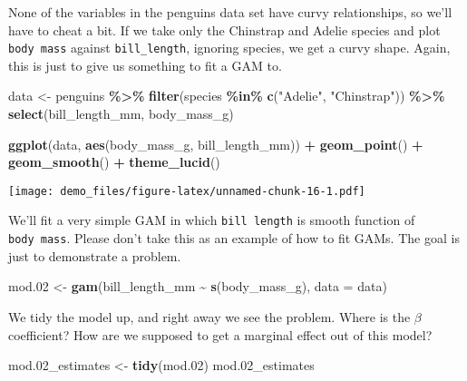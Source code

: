 \documentclass[
]{article}
\newenvironment{Shaded}{\begin{snugshade}}{\end{snugshade}}
\newcommand{\AttributeTok}[1]{\textcolor[rgb]{0.13,0.29,0.53}{#1}}
\newcommand{\FloatTok}[1]{\textcolor[rgb]{0.00,0.00,0.81}{#1}}
\newcommand{\FunctionTok}[1]{\textcolor[rgb]{0.13,0.29,0.53}{\textbf{#1}}}
\newcommand{\NormalTok}[1]{#1}
\newcommand{\OtherTok}[1]{\textcolor[rgb]{0.56,0.35,0.01}{#1}}
\newcommand{\SpecialCharTok}[1]{\textcolor[rgb]{0.81,0.36,0.00}{\textbf{#1}}}
\newcommand{\StringTok}[1]{\textcolor[rgb]{0.31,0.60,0.02}{#1}}
\begin{document}
None of the variables in the penguins data set have curvy relationships,
so we'll have to cheat a bit. If we take only the Chinstrap and Adelie
species and plot \texttt{body\ mass} against \texttt{bill\_length},
ignoring species, we get a curvy shape. Again, this is just to give us
something to fit a GAM to.

\begin{Shaded}
\begin{Highlighting}[]
\NormalTok{data }\OtherTok{\textless{}{-}}\NormalTok{ penguins }\SpecialCharTok{\%\textgreater{}\%}
  \FunctionTok{filter}\NormalTok{(species }\SpecialCharTok{\%in\%} \FunctionTok{c}\NormalTok{(}\StringTok{"Adelie"}\NormalTok{, }\StringTok{"Chinstrap"}\NormalTok{)) }\SpecialCharTok{\%\textgreater{}\%}
  \FunctionTok{select}\NormalTok{(bill\_length\_mm, body\_mass\_g)}

\FunctionTok{ggplot}\NormalTok{(data, }\FunctionTok{aes}\NormalTok{(body\_mass\_g, bill\_length\_mm)) }\SpecialCharTok{+}
  \FunctionTok{geom\_point}\NormalTok{() }\SpecialCharTok{+}
  \FunctionTok{geom\_smooth}\NormalTok{() }\SpecialCharTok{+}
  \FunctionTok{theme\_lucid}\NormalTok{()}
\end{Highlighting}
\end{Shaded}

\texttt{[image: demo\_files/figure-latex/unnamed-chunk-16-1.pdf]}

We'll fit a very simple GAM in which \texttt{bill\ length} is smooth
function of \texttt{body\ mass}. Please don't take this as an example of
how to fit GAMs. The goal is just to demonstrate a problem.

\begin{Shaded}
\begin{Highlighting}[]
\NormalTok{mod}\FloatTok{.02} \OtherTok{\textless{}{-}} \FunctionTok{gam}\NormalTok{(bill\_length\_mm }\SpecialCharTok{\textasciitilde{}} \FunctionTok{s}\NormalTok{(body\_mass\_g),}
              \AttributeTok{data =}\NormalTok{ data)}
\end{Highlighting}
\end{Shaded}

We tidy the model up, and right away we see the problem. Where is the
\(\beta\) coefficient? How are we supposed to get a marginal effect out
of this model?

\begin{Shaded}
\begin{Highlighting}[]
\NormalTok{mod}\FloatTok{.02}\NormalTok{\_estimates }\OtherTok{\textless{}{-}} \FunctionTok{tidy}\NormalTok{(mod}\FloatTok{.02}\NormalTok{)}
\NormalTok{mod}\FloatTok{.02}\NormalTok{\_estimates}
\end{Highlighting}
\end{Shaded}
\end{document}
